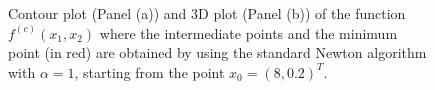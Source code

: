 \documentclass[a4paper,11pt]{article}
\begin{document}
	\begin{figure}[H]
		\centering
		 \quad
		\caption{Contour plot (Panel (a)) and 3D plot (Panel (b)) of the function $f^{(c)}(x_{1},x_{2})$ where the intermediate points and the minimum point (in red) are obtained by using the standard Newton algorithm with $\alpha=1$, starting from the point $x_{0}=(8,0.2)^{T}$.}
		\label{Fig:func_d_x0_1}
	\end{figure}
\end{document}
